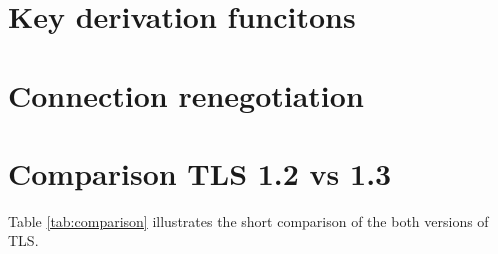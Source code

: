 \section{Key derivation funcitons}
\label{sec:comparison_kdf}

\section{Connection renegotiation}
\label{sec:comparison_renegotiation}

\section{Comparison TLS 1.2 vs 1.3}
\label{sec:comparison}

Table \ref{tab:comparison} illustrates the short comparison of the both versions of TLS.

